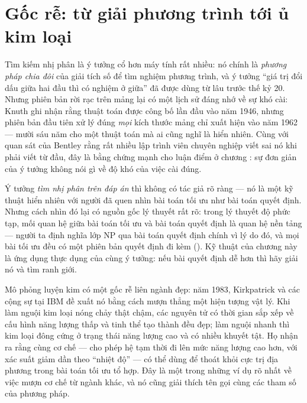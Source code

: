 \documentclass[../../algorithm.tex]{subfiles}
\begin{document}
\section{Gốc rễ: từ giải phương trình tới ủ kim loại}

Tìm kiếm nhị phân là ý tưởng cổ hơn máy tính rất nhiều: nó chính là \emph{phương pháp chia đôi} của giải tích số để tìm nghiệm phương trình, và ý tưởng ``giá trị đổi dấu giữa hai đầu thì có nghiệm ở giữa'' đã được dùng từ lâu trước thế kỷ 20. Nhưng phiên bản rời rạc trên mảng lại có một lịch sử đáng nhớ về sự khó cài: Knuth ghi nhận rằng thuật toán được công bố lần đầu vào năm 1946, nhưng phiên bản đầu tiên xử lý đúng \emph{mọi} kích thước mảng chỉ xuất hiện vào năm 1962 --- mười sáu năm cho một thuật toán mà ai cũng nghĩ là hiển nhiên. Cùng với quan sát của Bentley\cite{bentley2000} rằng rất nhiều lập trình viên chuyên nghiệp viết sai nó khi phải viết từ đầu, đây là bằng chứng mạnh cho luận điểm ở chương : sự đơn giản của ý tưởng không nói gì về độ khó của việc cài đúng.

Ý tưởng \emph{tìm nhị phân trên đáp án} thì không có tác giả rõ ràng --- nó là một kỹ thuật hiển nhiên với người đã quen nhìn bài toán tối ưu như bài toán quyết định. Nhưng cách nhìn đó lại có nguồn gốc lý thuyết rất rõ: trong lý thuyết độ phức tạp, mối quan hệ giữa bài toán tối ưu và bài toán quyết định là quan hệ nền tảng --- người ta định nghĩa lớp NP qua bài toán quyết định chính vì lý do đó, và mọi bài tối ưu đều có một phiên bản quyết định đi kèm (). Kỹ thuật của chương này là ứng dụng thực dụng của cùng ý tưởng: nếu bài quyết định dễ hơn thì hãy giải nó và tìm ranh giới.

Mô phỏng luyện kim có một gốc rễ liên ngành đẹp: năm 1983, Kirkpatrick và các cộng sự tại IBM đề xuất nó bằng cách mượn thẳng một hiện tượng vật lý. Khi làm nguội kim loại nóng chảy thật chậm, các nguyên tử có thời gian sắp xếp về cấu hình năng lượng thấp và tinh thể tạo thành đều đẹp; làm nguội nhanh thì kim loại đông cứng ở trạng thái năng lượng cao và có nhiều khuyết tật. Họ nhận ra rằng cùng cơ chế --- cho phép hệ tạm thời đi lên mức năng lượng cao hơn, với xác suất giảm dần theo ``nhiệt độ'' --- có thể dùng để thoát khỏi cực trị địa phương trong bài toán tối ưu tổ hợp. Đây là một trong những ví dụ rõ nhất về việc mượn cơ chế từ ngành khác, và nó cũng giải thích tên gọi cùng các tham số của phương pháp.
\end{document}
